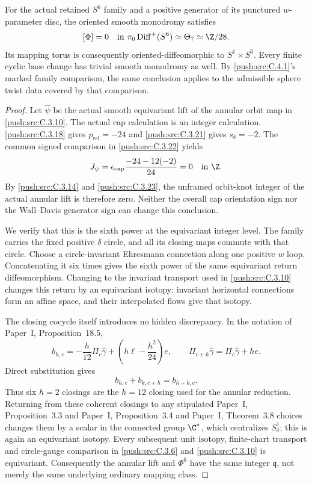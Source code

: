 \begin{theorem}\label{push:src:C.3.24}
For the actual retained $S^6$ family and a positive generator
of its punctured $w$-parameter disc, the oriented smooth
monodromy satisfies
\[
 [\Phi]=0\quad\hbox{in }\pi_0\operatorname{Diff}^+(S^6)
                       \simeq\Theta_7\simeq\Z/28.
\]
Its mapping torus is consequently oriented-diffeomorphic to
$S^1\times S^6$. Every finite cyclic base change has trivial
smooth monodromy as well. By \ref{push:src:C.4.1}'s marked family comparison,
the same conclusion applies to the admissible sphere twist
data covered by that comparison.
\end{theorem}
\begin{proof}
Let $\widehat\psi$ be the actual smooth equivariant lift of
the annular orbit map in \ref{push:src:C.3.10}.
The actual cap calculation is an integer calculation.
\ref{push:src:C.3.18} gives $p_{\mathrm{rel}}=-24$ and \ref{push:src:C.3.21} gives
$s_\delta=-2$. The common signed comparison in \ref{push:src:C.3.22} yields
\[
 J_\psi=\epsilon_{\rm cap}
          \frac{-24-12(-2)}{24}=0\quad\hbox{in }\Z.
\]
By \ref{push:src:C.3.14} and \ref{push:src:C.3.23}, the unframed orbit-knot integer of the
actual annular lift is therefore zero. Neither the overall cap
orientation sign nor the Wall--Davis generator sign can change
this conclusion.

We verify that this is the sixth power at the equivariant
integer level. The family carries the fixed positive
$\delta$ circle, and all its closing maps commute with that
circle. Choose a circle-invariant Ehresmann connection along
one positive $w$ loop. Concatenating it six times gives the
sixth power of the same equivariant return diffeomorphism.
Changing to the invariant transport used in \ref{push:src:C.3.10} changes
this return by an equivariant isotopy: invariant horizontal
connections form an affine space, and their interpolated
flows give that isotopy.

The closing cocycle itself introduces no hidden discrepancy.
In the notation of Paper~I, Proposition~18.5,
\[
 b_{h,c}=-\frac{h}{12}\Pi_c\widehat\gamma
             +\left(h\ell-\frac{h^2}{24}\right)e,
 \qquad \Pi_{c+h}\widehat\gamma
                   =\Pi_c\widehat\gamma+h e.
\]
Direct substitution gives
\[
 b_{h,c}+b_{k,c+h}=b_{h+k,c}.
\]
Thus six $h=2$ closings are the $h=12$ closing used for the
annular reduction. Returning from these coherent closings to
any stipulated Paper~I, Proposition~3.3 and Paper~I, Proposition~3.4 and Paper~I, Theorem~3.8 choices changes them by a scalar in the
connected group $\C^*$, which centralizes $S^1_\delta$;
this is again an equivariant isotopy. Every subsequent unit isotopy, finite-chart
transport and circle-gauge comparison in \ref{push:src:C.3.6} and \ref{push:src:C.3.10} is
equivariant. Consequently the annular lift and $\Phi^6$ have
the same integer $\mathfrak q$, not merely the same underlying
ordinary mapping class.


\end{proof}
